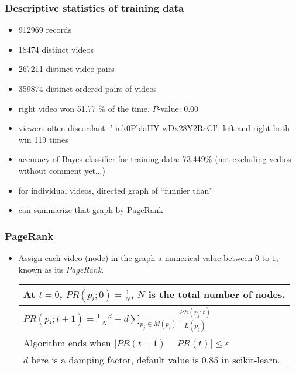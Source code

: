 \documentclass[fleqn]{beamer}
\begin{document}
 \begin{frame}
\frametitle{Descriptive statistics of training data}
      \begin{itemize}
         \item 912969 records
         \item 18474 distinct videos
         \item 267211 distinct video pairs
         \item 359874 distinct ordered pairs of videos
         \item right video won 51.77 \% of the time. $P$-value: 0.00
         \item viewers often discordant: '-iuk0PbfaHY wDx28Y2RcCI': left and right both win 119 times
         \item accuracy of Bayes classifier for training data: 73.449\% (not excluding vedios without comment yet...)
         \item for individual videos, directed graph of ``funnier than''
         \item can summarize that graph by PageRank
     \end{itemize}

\end{frame}

\begin{frame}
\frametitle{PageRank}
      \begin{itemize}
         \item Assign each video (node) in the graph a numerical value
         between $0$ to $1$, known as its \textsl{PageRank}.
         \begin{center}
         \begin{tabular}{| l |}
         \hline
         At $t=0$, $PR(p_{i};0) = \frac{1}{N}$, $N$ is the total number of nodes. \\ \hline
         $PR(p_{i};t+1) = \frac{1-d}{N} + d \sum_{p_{j} \in M(p_{i})} \frac{PR(p_{j};t)}{L(p_{j})}$ \\ \hline
         Algorithm ends when $|PR(t+1) - PR(t)| \le \epsilon$ \\ \hline
         $d$ here is a damping factor, default value is $0.85$ in scikit-learn. \\
         \hline
         \end{tabular}
         \end{center}
     \end{itemize}

\end{frame}
\end{document}
